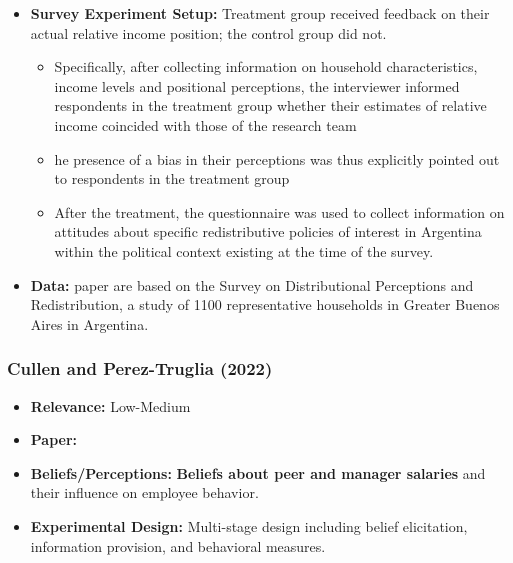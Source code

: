 \documentclass[a4paper, 12pt]{article}
\begin{document}
\begin{itemize}
\begin{itemize}
    \end{itemize}
    \item \textbf{Survey Experiment Setup:} Treatment group received feedback on their actual relative income position; the control group did not.
    \begin{itemize}
        \item Specifically, after collecting information on household characteristics, income levels and positional perceptions, the interviewer informed respondents in the treatment group whether their estimates of relative income coincided with those of the research team
        \item he presence of a bias in their perceptions was thus explicitly pointed out to respondents in the treatment group
        \item After the treatment, the questionnaire was used to collect information on attitudes about specific redistributive policies of interest in Argentina within the political context existing at the time of the survey.
    \end{itemize}
    \item \textbf{Data:} paper are based on the Survey on Distributional Perceptions and Redistribution, a study of 1100 representative households in Greater Buenos Aires in Argentina.
\end{itemize}

\subsubsection*{Cullen and Perez-Truglia (2022)}
\begin{itemize}
    \item \textbf{Relevance:} Low-Medium
    \item \textbf{Paper:} 
    \item \textbf{Beliefs/Perceptions:} \textbf{Beliefs about peer and manager salaries} and their influence on employee behavior.
    \item \textbf{Experimental Design:} Multi-stage design including belief elicitation, information provision, and behavioral measures.
\end{itemize}
\end{document}
